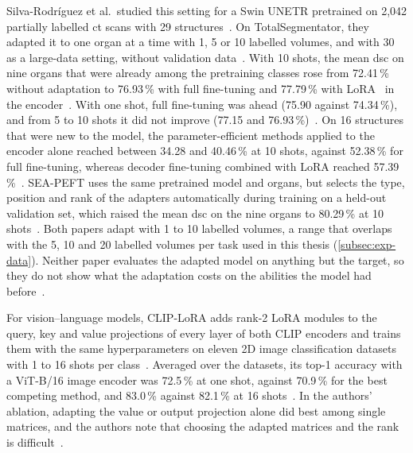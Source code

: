 Silva-Rodríguez et al.\ studied this setting for a Swin UNETR pretrained on 2{,}042 partially labelled \gls{ct} scans with 29 structures~\cite{silvarodriguez2023fseft}.
On TotalSegmentator, they adapted it to one organ at a time with 1, 5 or 10 labelled volumes, and with 30 as a large-data setting, without validation data~\cite{silvarodriguez2023fseft}.
With 10 shots, the mean \gls{dsc} on nine organs that were already among the pretraining classes rose from 72.41\,\% without adaptation to 76.93\,\% with full fine-tuning and 77.79\,\% with LoRA~\cite{hu2022lora} in the encoder~\cite{silvarodriguez2023fseft}.
With one shot, full fine-tuning was ahead (75.90 against 74.34\,\%), and from 5 to 10 shots it did not improve (77.15 and 76.93\,\%)~\cite{silvarodriguez2023fseft}.
On 16 structures that were new to the model, the parameter-efficient methods applied to the encoder alone reached between 34.28 and 40.46\,\% at 10 shots, against 52.38\,\% for full fine-tuning, whereas decoder fine-tuning combined with LoRA reached 57.39\,\%~\cite{silvarodriguez2023fseft}.
SEA-PEFT uses the same pretrained model and organs, but selects the type, position and rank of the adapters automatically during training on a held-out validation set, which raised the mean \gls{dsc} on the nine organs to 80.29\,\% at 10 shots~\cite{ly2026seapeft}.
Both papers adapt with 1 to 10 labelled volumes, a range that overlaps with the 5, 10 and 20 labelled volumes per task used in this thesis (\cref{subsec:exp-data}).
Neither paper evaluates the adapted model on anything but the target, so they do not show what the adaptation costs on the abilities the model had before~\cite{silvarodriguez2023fseft,ly2026seapeft}.

For vision--language models, CLIP-LoRA adds rank-2 LoRA modules to the query, key and value projections of every layer of both CLIP encoders and trains them with the same hyperparameters on eleven 2D image classification datasets with 1 to 16 shots per class~\cite{zanella2024lowrankfewshotadaptationvisionlanguage}.
Averaged over the datasets, its top-1 accuracy with a ViT-B/16 image encoder was 72.5\,\% at one shot, against 70.9\,\% for the best competing method, and 83.0\,\% against 82.1\,\% at 16 shots~\cite{zanella2024lowrankfewshotadaptationvisionlanguage}.
In the authors' ablation, adapting the value or output projection alone did best among single matrices, and the authors note that choosing the adapted matrices and the rank is difficult~\cite{zanella2024lowrankfewshotadaptationvisionlanguage}.

